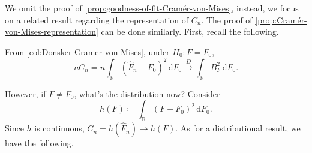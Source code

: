 We omit the proof of \autoref{prop:goodness-of-fit-Cramér-von-Mises}, instead, we focus on a related result regarding the representation of \(C_n\). The proof of \autoref{prop:Cramér-von-Mises-representation} can be done similarly. First, recall the following.

\begin{prev}
	From \autoref{col:Donsker-Cramer-von-Mises}, under \(H_0 \colon F = F_0\),
	\[
		n C_n
		= n \int _\mathbb{R} (\hat{F} _n - F_0)^2 \,\mathrm{d} F_0
		\overset{D}{\to } \int _\mathbb{R} B_F^2 \,\mathrm{d} F_0.
	\]
\end{prev}

However, if \(F \neq F_0\), what's the distribution now? Consider
\[
	h(F) \coloneqq \int _\mathbb{R} (F - F_0)^2 \,\mathrm{d} F_0.
\]
Since \(h\) is continuous, \(C_n = h(\hat{F} _n) \to h(F) \). As for a distributional result, we have the following.

